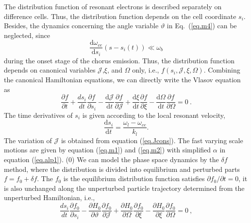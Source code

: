 The distribution function of resonant electrons is described separately on difference cells.
Thus, the distribution function depends on the cell coordinate $s_i$.
Besides, the dynamics concerning the angle variable $\vartheta$ in Eq.~(\ref{eq.m4}) can be neglected, since
\begin{equation}
   \frac{\mathrm{d} \omega_{ce}}{\mathrm{d} s_{i}}\left(s-s_{i}(t)\right) \ll \omega_b
\end{equation}
during the onset stage of the chorus emission.
Thus, the distribution function depends on canonical variables $\mathcal{J}$,$\xi$, and $\Omega$ only, i.e., $f(s_i,\mathcal{J},\xi,\Omega)$.
Combining the canonical Hamiltonian equations, we can directly write the Vlasov equation as 
\begin{equation}\label{eq.vlasov}
    \frac{\partial f}{\partial t}+ \frac{d s_{i}}{d t} \frac{\partial f}{\partial s_{i}} - \frac{\mathrm{d} \mathcal{J}}{\mathrm{d}t} \frac{\partial f}{\partial \mathcal{J}} + \frac{\mathrm{d}\xi}{\mathrm{d} t} \frac{\partial f}{\partial \xi} - \frac{\mathrm{d}\Omega}{\mathrm{d} t} \frac{\partial f}{\partial \Omega}=0~.
\end{equation}
The time derivatives of $s_i$ is given according to the local resonant velocity,
\begin{equation}
    \frac{\mathrm{d}s_i}{\mathrm{d}t} = \frac{\omega_l- \omega_{ce}}{k_l}.
\end{equation}
The variation of $\mathcal{J}$ is obtained from equation (\ref{eq.Jcons}).
The fast varying scale motions are given by equation (\ref{eq.m1}) and (\ref{eq.m2}) with simplified $\alpha$ in equation (\ref{eq.alp1}).
\if(0)
We can model the phase space dynamics by the $\delta f$ method, where the distribution is divided into equilibrium and perturbed parts $f = f_0 + \delta f$. The $f_0$ is the equilibrium distribution function satisfies $\partial f_0 /\partial t = 0$, it is also unchanged along the unperturbed particle trajectory determined from the unperturbed Hamiltonian, i.e.,
\begin{equation}
    \frac{d s_{i}}{d t} \frac{\partial f_0}{\partial s_{i}} - \frac{\partial H_0}{\partial \vartheta} \frac{\partial f_0}{\partial \mathcal{J}} + \frac{\partial H_0}{\partial \Omega} \frac{\partial f_0}{\partial \xi} - \frac{\partial H_0}{\partial \xi} \frac{\partial f_0}{\partial \Omega}=0~,
\end{equation}
